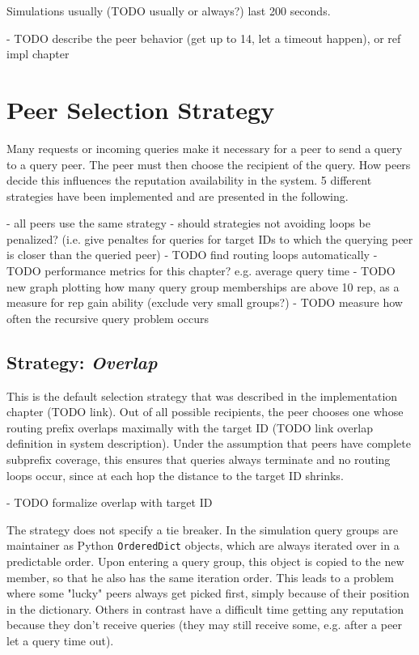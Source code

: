 Simulations usually (TODO usually or always?) last 200 seconds.

- TODO describe the peer behavior (get up to 14, let a timeout happen), or ref
  impl chapter

\section{Peer Selection Strategy}
\label{sec:selection}
Many requests or incoming queries make it necessary for a peer to send a query
to a query peer. The peer must then choose the recipient of the query. How peers
decide this influences the reputation availability in the system. 5 different
strategies have been implemented and are presented in the following.

- all peers use the same strategy
- should strategies not avoiding loops be penalized? (i.e. give penaltes for
  queries for target IDs to which the querying peer is closer than the queried
  peer)
- TODO find routing loops automatically
- TODO performance metrics for this chapter? e.g. average query time
- TODO new graph plotting how many query group memberships are above 10 rep, as
  a measure for rep gain ability (exclude very small groups?)
- TODO measure how often the recursive query problem occurs

\subsection{Strategy: \emph{Overlap}}
\label{sec:rep_avail_selection_overlap}
This is the default selection strategy that was described in the implementation
chapter (TODO link). Out of all possible recipients, the peer chooses one whose
routing prefix overlaps maximally with the target ID (TODO link overlap
definition in system description). Under the assumption that peers have complete
subprefix coverage, this ensures that queries always terminate and no routing
loops occur, since at each hop the distance to the target ID shrinks.

- TODO formalize overlap with target ID

The strategy does not specify a tie breaker. In the simulation query groups are
maintainer as Python \texttt{OrderedDict} objects, which are always iterated
over in a predictable order. Upon entering a query group, this object is copied
to the new member, so that he also has the same iteration order. This leads to a
problem where some "lucky" peers always get picked first, simply because of
their position in the dictionary. Others in contrast have a difficult time
getting any reputation because they don't receive queries (they may still
receive some, e.g.  after a peer let a query time out).

